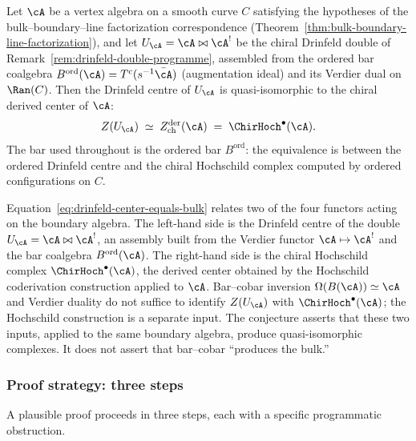 \begin{conjecture}
\label{conj:drinfeld-center-equals-bulk}
Let $\cA$ be a vertex algebra on a smooth curve $C$ satisfying the
hypotheses of the bulk--boundary--line factorization correspondence
\textup{(}Theorem~\textup{\ref{thm:bulk-boundary-line-factorization}}\textup{)},
and let $U_\cA = \cA \bowtie \cA^!$ be the chiral Drinfeld double of
Remark~\textup{\ref{rem:drinfeld-double-programme}}, assembled from the
ordered bar coalgebra $B^{\mathrm{ord}}(\cA) = T^c(s^{-1}\bar\cA)$
\textup{(}augmentation ideal\textup{)} and its Verdier
dual on $\Ran(C)$. Then the Drinfeld centre of $U_\cA$ is
quasi-isomorphic to the chiral derived center of $\cA$:
\begin{equation}
\label{eq:drinfeld-center-equals-bulk}
Z(U_\cA) \;\simeq\; Z^{\mathrm{der}}_{\mathrm{ch}}(\cA)
\;=\; \ChirHoch^\bullet(\cA).
\end{equation}
The bar used throughout is the ordered bar $B^{\mathrm{ord}}$: the equivalence is between the
ordered Drinfeld centre and the chiral Hochschild complex computed by
ordered configurations on $C$.
\end{conjecture}

\begin{remark}
\label{rem:drinfeld-center-four-functors}
Equation~\eqref{eq:drinfeld-center-equals-bulk} relates two of the four
functors acting on the boundary algebra. The left-hand side is the
Drinfeld centre of the double $U_\cA = \cA \bowtie \cA^!$, an assembly
built from the Verdier functor $\cA \mapsto \cA^!$ and the bar coalgebra
$B^{\mathrm{ord}}(\cA)$. The right-hand side is the chiral Hochschild
complex $\ChirHoch^\bullet(\cA)$, the derived center obtained by the
Hochschild coderivation construction applied to $\cA$. Bar--cobar inversion
$\Omega(B(\cA)) \simeq \cA$ and Verdier duality do not suffice to identify
$Z(U_\cA)$ with $\ChirHoch^\bullet(\cA)$; the Hochschild construction is a
separate input. The conjecture asserts that these two inputs, applied
to the same boundary algebra, produce quasi-isomorphic complexes. It
does not assert that bar--cobar ``produces the bulk.''
\end{remark}

\subsubsection{Proof strategy: three steps}

A plausible proof proceeds in three steps, each with a specific
programmatic obstruction.

